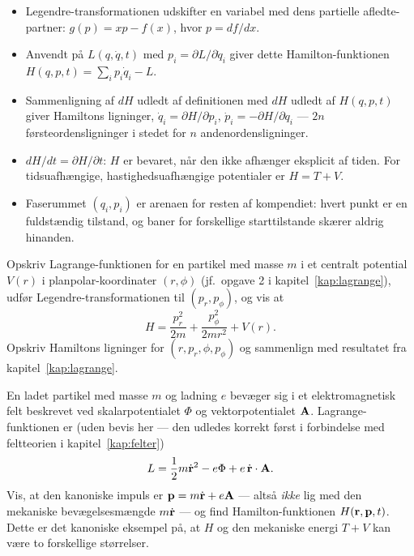\begin{itemize}
  \item Legendre-transformationen udskifter en variabel med dens
        partielle afledte-partner: $g(p)=xp-f(x)$, hvor $p=df/dx$.
  \item Anvendt på $L(q,\dot q,t)$ med $p_i=\partial L/\partial\dot q_i$
        giver dette Hamilton-funktionen
        $H(q,p,t)=\sum_i p_i\dot q_i - L$.
  \item Sammenligning af $dH$ udledt af definitionen med $dH$ udledt af
        $H(q,p,t)$ giver Hamiltons ligninger,
        $\dot q_i=\partial H/\partial p_i$,
        $\dot p_i=-\partial H/\partial q_i$ — $2n$
        førsteordensligninger i stedet for $n$ andenordensligninger.
  \item $dH/dt = \partial H/\partial t$: $H$ er bevaret, når den ikke
        afhænger eksplicit af tiden. For tidsuafhængige,
        hastighedsuafhængige potentialer er $H=T+V$.
  \item Faserummet $(q_i,p_i)$ er arenaen for resten af kompendiet:
        hvert punkt er en fuldstændig tilstand, og baner for forskellige
        starttilstande skærer aldrig hinanden.
\end{itemize}

\begin{opgave}
Opskriv Lagrange-funktionen for en partikel med masse $m$ i et
centralt potential $V(r)$ i planpolar-koordinater $(r,\phi)$ (jf.\
opgave 2 i kapitel~\ref{kap:lagrange}), udfør Legendre-transformationen
til $(p_r,p_\phi)$, og vis at
\begin{equation}
  H = \frac{p_r^2}{2m} + \frac{p_\phi^2}{2mr^2} + V(r).
\end{equation}
Opskriv Hamiltons ligninger for $(r,p_r,\phi,p_\phi)$ og sammenlign med
resultatet fra kapitel~\ref{kap:lagrange}.
\end{opgave}

\begin{opgave}
En ladet partikel med masse $m$ og ladning $e$ bevæger sig i et
elektromagnetisk felt beskrevet ved skalarpotentialet $\Phi$ og
vektorpotentialet $\vb{A}$. Lagrange-funktionen er (uden bevis her —
den udledes korrekt først i forbindelse med feltteorien i
kapitel~\ref{kap:felter})
\begin{equation}
  L = \frac12 m\dot{\vb{r}}^2 - e\Phi + e\,\dot{\vb{r}}\cdot\vb{A}.
\end{equation}
Vis, at den kanoniske impuls er $\vb{p}=m\dot{\vb{r}}+e\vb{A}$ — altså
\emph{ikke} lig med den mekaniske bevægelsesmængde $m\dot{\vb{r}}$ —
og find Hamilton-funktionen $H(\vb{r},\vb{p},t)$. Dette er det
kanoniske eksempel på, at $H$ og den mekaniske energi $T+V$ kan være to
forskellige størrelser.
\end{opgave}

